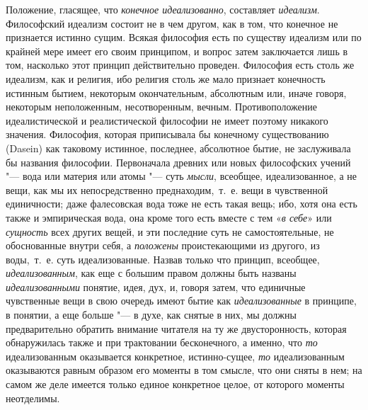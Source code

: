 Положение, гласящее, что {\em конечное идеализованно},
составляет {\em идеализм}. Философский идеализм состоит
не в чем другом, как в том, что конечное не признается истинно сущим.
Всякая философия есть по существу идеализм или по крайней мере имеет его
своим принципом, и вопрос затем заключается лишь в том, насколько этот
принцип действительно проведен. Философия есть столь же идеализм, как и
религия, ибо религия столь же мало признает конечность истинным бытием,
некоторым окончательным, абсолютным или, иначе говоря, некоторым
неположенным, несотворенным, вечным. Противоположение идеалистической и
реалистической философии не имеет поэтому никакого значения. Философия,
которая приписывала бы конечному существованию (Dasein) как таковому
истинное, последнее, абсолютное бытие, не заслуживала бы названия
философии. Первоначала древних или новых философских учений "--- вода или
материя или атомы "--- суть {\em мысли}, всеобщее,
идеализованное, а не вещи, как мы их непосредственно преднаходим,~т.~е.
вещи в чувственной единичности; даже фалесовская вода тоже не есть такая
вещь; ибо, хотя она есть также и эмпирическая вода, она кроме того есть
вместе с тем «{\em в себе}» или
{\em сущность} всех других вещей, и эти последние суть
не самостоятельные, не обоснованные внутри себя, а
{\em положены} проистекающими из другого, из
воды,~т.~е. суть идеализованные. Назвав только что принцип, всеобщее,
{\em идеализованным}, как еще с большим правом должны
быть названы {\em идеализованными} понятие, идея, дух,
и, говоря затем, что единичные чувственные вещи в свою очередь имеют бытие
как {\em идеализованные} в принципе, в понятии, а еще
больше "--- в духе, как снятые в них, мы должны предварительно обратить
внимание читателя на ту же двусторонность, которая обнаружилась также и при
трактовании бесконечного, а именно, что {\em то}
идеализованным оказывается конкретное, истинно-сущее,
{\em то} идеализованным оказываются равным образом его
моменты в том смысле, что они сняты в нем; на самом же деле имеется только
единое конкретное целое, от которого моменты неотделимы.

